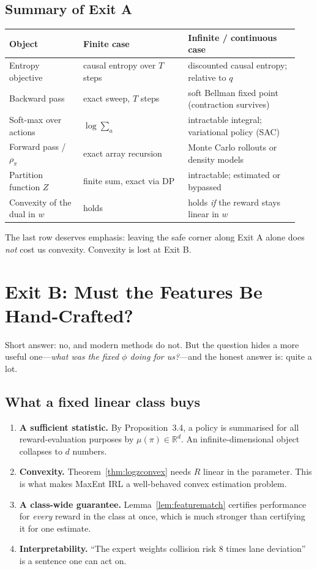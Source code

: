 \documentclass[11pt]{article}
\theoremstyle{plain}
\theoremstyle{definition}
\theoremstyle{remark}
\newcommand{\R}{\mathbb{R}}
\begin{document}
\subsection{Summary of Exit A}

\begin{center}
\begin{tabular}{@{}p{0.24\linewidth}p{0.34\linewidth}p{0.36\linewidth}@{}}
\toprule
\textbf{Object} & \textbf{Finite case} & \textbf{Infinite / continuous case}\\
\midrule
Entropy objective & causal entropy over $T$ steps & discounted causal
entropy; relative to $q$\\
Backward pass & exact sweep, $T$ steps & soft Bellman fixed point
(contraction survives)\\
Soft-max over actions & $\log\sum_a$ & intractable integral; variational
policy (SAC)\\
Forward pass / $\rho_\pi$ & exact array recursion & Monte Carlo rollouts or
density models\\
Partition function $Z$ & finite sum, exact via DP & intractable; estimated
or bypassed\\
Convexity of the dual in $w$ & holds & holds \emph{if} the reward stays
linear in $w$\\
\bottomrule
\end{tabular}
\end{center}

The last row deserves emphasis: leaving the safe corner along Exit A alone
does \emph{not} cost us convexity. Convexity is lost at Exit B.

\section{Exit B: Must the Features Be Hand-Crafted?}
\label{sec:exitb}

Short answer: no, and modern methods do not. But the question hides a more
useful one---\emph{what was the fixed $\phi$ doing for us?}---and the
honest answer is: quite a lot.

\subsection{What a fixed linear class buys}

\begin{enumerate}
\item \textbf{A sufficient statistic.} By Proposition~3.4, a policy is
summarised for all reward-evaluation purposes by $\mu(\pi)\in\R^d$. An
infinite-dimensional object collapses to $d$ numbers.
\item \textbf{Convexity.} Theorem~\ref{thm:logzconvex} needs $R$ linear in
the parameter. This is what makes MaxEnt IRL a well-behaved convex
estimation problem.
\item \textbf{A class-wide guarantee.} Lemma~\ref{lem:featurematch}
certifies performance for \emph{every} reward in the class at once, which
is much stronger than certifying it for one estimate.
\item \textbf{Interpretability.} ``The expert weights collision risk 8
times lane deviation'' is a sentence one can act on.
\end{enumerate}
\end{document}

